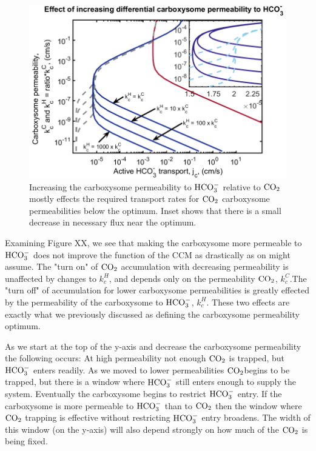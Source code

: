 \documentclass[]{article}
\begin{document}
\begin{figure}
	\includegraphics[width = \textwidth]{kcCkcHratio.png}
	\caption{Increasing the carboxysome permeability to ${\rm HCO_3^-}$ relative to ${\rm CO_2}$ mostly effects the required transport rates for ${\rm CO_2}$ carboxysome permeabilities below the optimum. Inset shows that there is a small decrease in necessary flux near the optimum.}
\end{figure}

Examining Figure XX, we see that making the carboxysome more permeable to ${\rm HCO_3^-}$ does not improve the function of the CCM as drastically as on might assume. The "turn on" of ${\rm CO_2}$ accumulation with decreasing permeability is unaffected by changes to $k_c^H$, and depends only on the permeability ${\rm CO_2}$, $k_c^C$.The "turn off" of accumulation for lower carboxysome permeabilities is greatly effected by the permeability of the carboxysome to ${\rm HCO_3^-}$, $k_c^H$. These two effects are exactly what we previously discussed as defining the carboxysome permeability optimum.

As we start at the top of the y-axis and decrease the carboxysome permeability the following occurs: At high permeability not enough ${\rm CO_2}$ is trapped, but ${\rm HCO_3^-}$ enters readily. As we moved to lower permeabilities ${\rm CO_2}$begins to be trapped, but there is a window where ${\rm HCO_3^-}$ still enters enough to supply the system. Eventually the carboxysome begins to restrict ${\rm HCO_3^-}$ entry. If the carboxysome is more permeable to ${\rm HCO_3^-}$ than to ${\rm CO_2}$ then the window where ${\rm CO_2}$ trapping is effective without restricting ${\rm HCO_3^-}$ entry broadens. The width of this window (on the y-axis) will also depend strongly on how much of the ${\rm CO_2}$ is being fixed.
\end{document}
